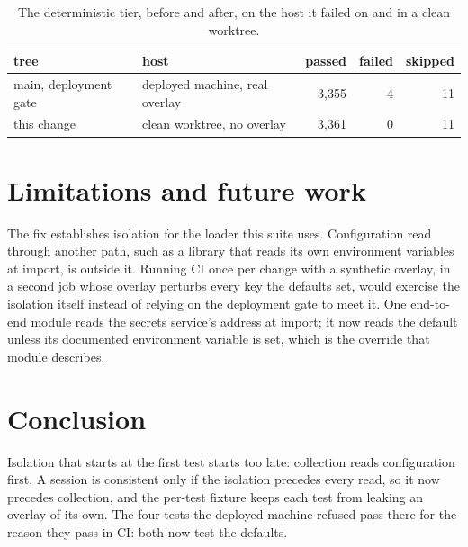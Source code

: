 \documentclass[11pt]{article}
\theoremstyle{plain}
\theoremstyle{definition}
\theoremstyle{remark}
\begin{document}
\begin{table}[h]
\centering
\caption{The deterministic tier, before and after, on the host it failed on and in a clean
worktree.}\label{tab:gates}
\begin{tabular}{@{}llrrr@{}}
\toprule
tree & host & passed & failed & skipped \\
\midrule
main, deployment gate & deployed machine, real overlay & 3{,}355 & 4 & 11 \\
this change & clean worktree, no overlay & 3{,}361 & 0 & 11 \\
\bottomrule
\end{tabular}
\end{table}

\section{Limitations and future work}
The fix establishes isolation for the loader this suite uses. Configuration read through another
path, such as a library that reads its own environment variables at import, is outside it. Running
CI once per change with a synthetic overlay, in a second job whose overlay perturbs every key the
defaults set, would exercise the isolation itself instead of relying on the deployment gate to meet
it. One end-to-end module reads the secrets service's address at import; it now reads the default
unless its documented environment variable is set, which is the override that module describes.

\section{Conclusion}
Isolation that starts at the first test starts too late: collection reads configuration first. A
session is consistent only if the isolation precedes every read, so it now precedes collection,
and the per-test fixture keeps each test from leaking an overlay of its own. The four tests the
deployed machine refused pass there for the reason they pass in CI: both now test the defaults.



\end{document}

